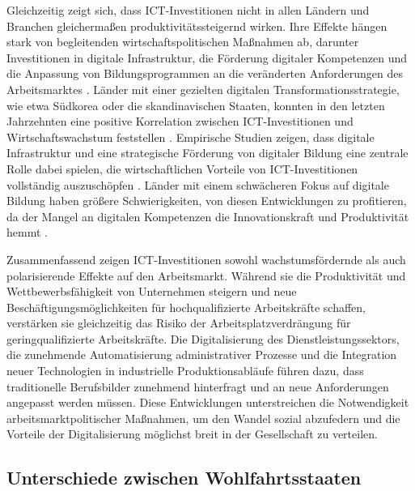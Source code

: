 Gleichzeitig zeigt sich, dass \ac{ICT}-Investitionen nicht in allen Ländern und Branchen 
gleichermaßen produktivitätssteigernd wirken. Ihre Effekte hängen stark von begleitenden 
wirtschaftspolitischen Maßnahmen ab, darunter Investitionen in digitale Infrastruktur, 
die Förderung digitaler Kompetenzen und die Anpassung von Bildungsprogrammen an die 
veränderten Anforderungen des Arbeitsmarktes 
\parencite[vgl.][S. 77]{brynjolfsson2014thesecond}. Länder mit einer gezielten digitalen 
Transformationsstrategie, wie etwa Südkorea oder die skandinavischen Staaten, konnten in 
den letzten Jahrzehnten eine positive Korrelation zwischen \ac{ICT}-Investitionen und 
Wirtschaftswachstum feststellen \parencite[vgl.][S. 34]{oecd2020digital}. Empirische 
Studien zeigen, dass digitale Infrastruktur und eine strategische Förderung von digitaler 
Bildung eine zentrale Rolle dabei spielen, die wirtschaftlichen Vorteile von 
\ac{ICT}-Investitionen vollständig auszuschöpfen \parencite[vgl.][S. 360]{vu2011ict}. 
Länder mit einem schwächeren Fokus auf digitale Bildung haben größere Schwierigkeiten, 
von diesen Entwicklungen zu profitieren, da der Mangel an digitalen Kompetenzen die 
Innovationskraft und Produktivität hemmt \parencite[vgl.][S. 34]{oecd2020digital}.

Zusammenfassend zeigen \ac{ICT}-Investitionen sowohl wachstumsfördernde als auch 
polarisierende Effekte auf den Arbeitsmarkt. Während sie die Produktivität und 
Wettbewerbsfähigkeit von Unternehmen steigern und neue Beschäftigungsmöglichkeiten für 
hochqualifizierte Arbeitskräfte schaffen, verstärken sie gleichzeitig das Risiko der 
Arbeitsplatzverdrängung für geringqualifizierte Arbeitskräfte. Die Digitalisierung des 
Dienstleistungssektors, die zunehmende Automatisierung administrativer Prozesse und die 
Integration neuer Technologien in industrielle Produktionsabläufe führen dazu, dass 
traditionelle Berufsbilder zunehmend hinterfragt und an neue Anforderungen angepasst 
werden müssen. Diese Entwicklungen unterstreichen die Notwendigkeit 
arbeitsmarktpolitischer Maßnahmen, um den Wandel sozial abzufedern und die Vorteile der 
Digitalisierung möglichst breit in der Gesellschaft zu verteilen.


\subsection{Unterschiede zwischen Wohlfahrtsstaaten}

